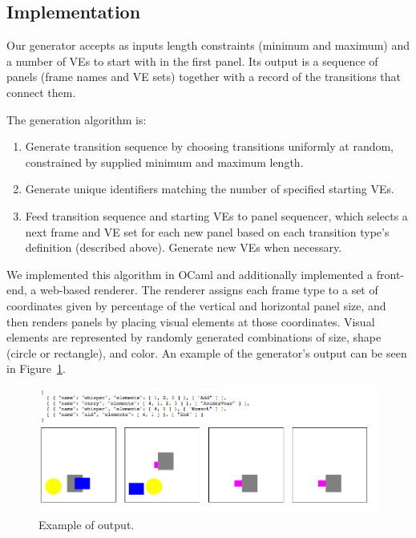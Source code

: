 \subsection{Implementation}

Our generator accepts as inputs length constraints (minimum and maximum)
and a number of VEs to start with in the first panel. Its output is a
sequence of panels (frame names and VE sets) together with a record of the
transitions that connect them.

The generation algorithm is:
\begin{enumerate}
\item Generate transition sequence by choosing transitions uniformly at
random, constrained by supplied minimum and maximum length.
\item Generate unique identifiers matching the number of specified starting
VEs.
\item Feed transition sequence and starting VEs to panel sequencer, which
selects a next frame and VE set for each new panel based on each
transition type's definition (described above). Generate new VEs when
necessary.
\end{enumerate}

We implemented this algorithm in OCaml and additionally implemented a
front-end, a web-based renderer. The renderer assigns each frame type to a set of
coordinates given by percentage of the vertical and horizontal panel size, and
then renders panels by placing visual elements at those coordinates. Visual
elements are represented by randomly generated combinations of size, shape
(circle or rectangle), and color.  An example of the generator's output can
be seen in Figure~\ref{fig:out1}.

\begin{figure}
\includegraphics[width=\columnwidth]{comicgen-unconstrained-ok.png}
\caption{Example of output.}
\label{fig:out1}
\end{figure}

